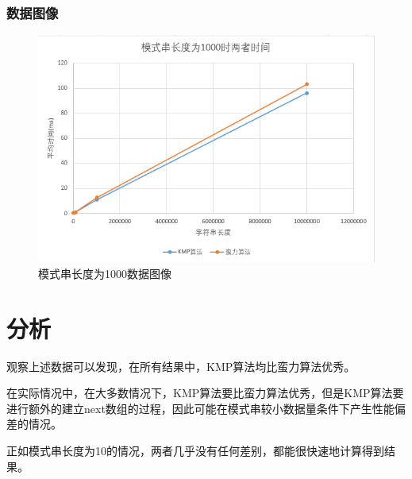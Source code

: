 \documentclass[UTF8]{ctexart}
\begin{document}
\subsubsection{数据图像}
\begin{figure}[h]
    \centering
    \includegraphics[scale=0.6]{1000.png}
    \caption{模式串长度为1000数据图像}
\end{figure}
\section{分析}
观察上述数据可以发现，在所有结果中，KMP算法均比蛮力算法优秀。

在实际情况中，在大多数情况下，KMP算法要比蛮力算法优秀，但是KMP算法要进行额外的建立next数组的过程，因此可能在模式串较小数据量条件下产生性能偏差的情况。

正如模式串长度为10的情况，两者几乎没有任何差别，都能很快速地计算得到结果。
\end{document}
